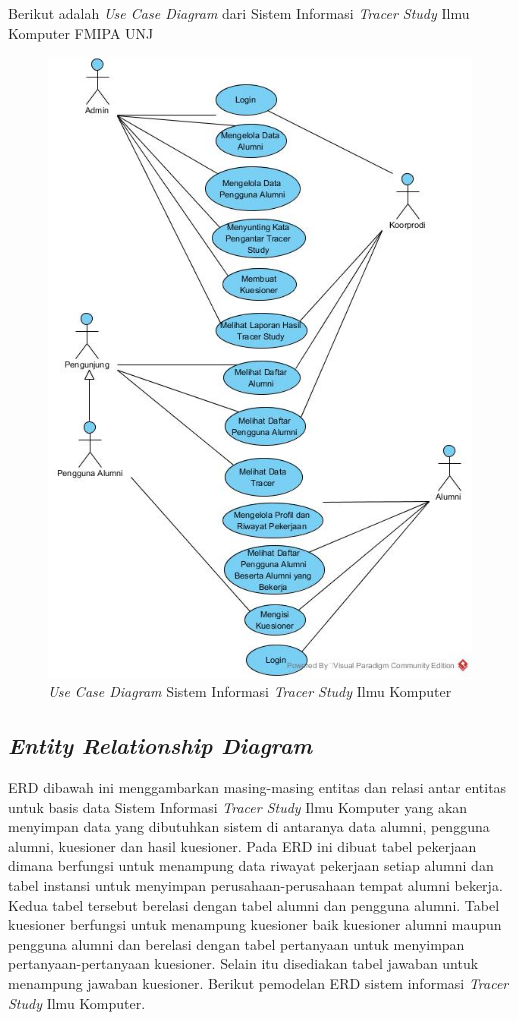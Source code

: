 Berikut adalah \textit{Use Case Diagram} dari Sistem Informasi \textit{Tracer Study} Ilmu Komputer FMIPA UNJ

\begin{figure}[H]
	\centering
	\includegraphics[width=1.0\textwidth]{gambar/usecase}
	\caption{\emph{Use Case Diagram} Sistem Informasi \textit{Tracer Study} Ilmu Komputer}
	\label{usecase_diagram}
\end{figure}


\subsection{\emph{Entity Relationship Diagram}}

ERD dibawah ini menggambarkan masing-masing entitas dan relasi antar entitas untuk basis data Sistem Informasi \textit{Tracer Study} Ilmu Komputer yang akan menyimpan data yang dibutuhkan sistem di antaranya data alumni, pengguna alumni, kuesioner dan hasil kuesioner. Pada ERD ini dibuat tabel pekerjaan dimana berfungsi untuk menampung data riwayat pekerjaan setiap alumni dan tabel instansi untuk menyimpan perusahaan-perusahaan tempat alumni bekerja. Kedua tabel tersebut berelasi dengan tabel alumni dan pengguna alumni. Tabel kuesioner berfungsi untuk menampung kuesioner baik kuesioner alumni maupun pengguna alumni dan berelasi dengan tabel pertanyaan untuk menyimpan pertanyaan-pertanyaan kuesioner. Selain itu disediakan tabel jawaban untuk menampung jawaban kuesioner. Berikut pemodelan ERD sistem informasi \textit{Tracer Study} Ilmu Komputer. 

